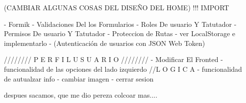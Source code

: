 (CAMBIAR ALGUNAS COSAS DEL DISEÑO DEL HOME) !!! IMPORT 


- Formik
- Validaciones Del los Formularios 
- Roles De usuario Y Tatutador
- Permisos De usuario Y Tatutador
- Proteccion de Rutas
- ver LocalStorage e implementarlo
- (Autenticación de usuarios con JSON Web Token)


////////   P E R F I L   U S U A R I O   ////////  
- Modificar El Fronted
- funcionalidad de las opciones del lado izquierdo
//L O G I C A
- funcionalidad de autualzar info 
- cambiar imagen
- cerrar sesion 

despues sacamos, que me dio pereza colcoar mas....


